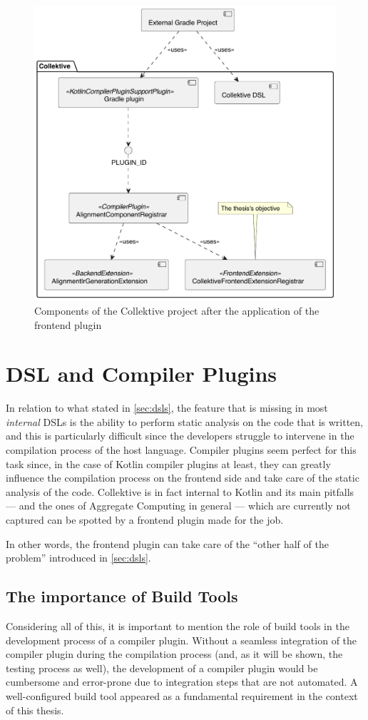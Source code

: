 \documentclass[12pt,a4paper,openright,twoside]{book}
\begin{document}
\begin{figure}
  \centering
  \includegraphics[width=.6\linewidth]{figures/collektive-components.pdf}
  \caption{Components of the Collektive project after the application of the frontend plugin}
  \label{fig:collektive-components-diagram}
\end{figure}

\section{DSL and Compiler Plugins}

In relation to what stated in \cref{sec:dsls}, the feature that is missing in
most \emph{internal} DSLs is the ability to perform static analysis on the code
that is written, and this is particularly difficult since the developers
struggle to intervene in the compilation process of the host language.
%
Compiler plugins seem perfect for this task since, in the case of Kotlin
compiler plugins at least, they can greatly influence the compilation process on
the frontend side and take care of the static analysis of the code. Collektive
is in fact internal to Kotlin and its main pitfalls --- and the ones of
Aggregate Computing in general --- which are currently not captured can be
spotted by a frontend plugin made for the job. 

In other words, the frontend plugin can take care of the ``other half of the 
problem'' introduced in \cref{sec:dsls}.

\subsection{The importance of Build Tools}

Considering all of this, it is important to mention the role of build tools in
the development process of a compiler plugin. Without a seamless integration of
the compiler plugin during the compilation process (and, as it will be shown,
the testing process as well), the development of a compiler plugin would be
cumbersome and error-prone due to integration steps that are not automated.
%
A well-configured build tool appeared as a fundamental requirement in the
context of this thesis.
\end{document}
